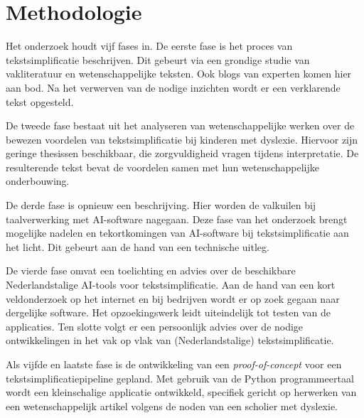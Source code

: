 



\section{Methodologie}%
\label{sec:methodologie}

Het onderzoek houdt vijf fases in. De eerste fase is het proces van tekstsimplificatie beschrijven. Dit gebeurt via een grondige studie van vakliteratuur en wetenschappelijke teksten. Ook blogs van experten komen hier aan bod. Na het verwerven van de nodige inzichten wordt er een verklarende tekst opgesteld.

De tweede fase bestaat uit het analyseren van wetenschappelijke werken over de bewezen voordelen van tekstsimplificatie bij kinderen met dyslexie. Hiervoor zijn geringe thesissen beschikbaar, die zorgvuldigheid vragen tijdens interpretatie. De resulterende tekst bevat de voordelen samen met hun wetenschappelijke onderbouwing.

De derde fase is opnieuw een beschrijving. Hier worden de valkuilen bij taalverwerking met AI-software nagegaan. Deze fase van het onderzoek brengt mogelijke nadelen en tekortkomingen van AI-software bij tekstsimplificatie aan het licht. Dit gebeurt aan de hand van een technische uitleg.

De vierde fase omvat een toelichting en advies over de beschikbare Nederlandstalige AI-tools voor tekstsimplificatie. Aan de hand van een kort veldonderzoek op het internet en bij bedrijven wordt er op zoek gegaan naar dergelijke software. Het opzoekingswerk leidt uiteindelijk tot testen van de applicaties. Ten slotte volgt er een persoonlijk advies over de nodige ontwikkelingen in het vak op vlak van (Nederlandstalige) tekstsimplificatie.

Als vijfde en laatste fase is de ontwikkeling van een \textit{proof-of-concept} voor een tekstsimplificatiepipeline gepland. Met gebruik van de Python programmeertaal wordt een kleinschalige applicatie ontwikkeld, specifiek gericht op herwerken van een wetenschappelijk artikel volgens de noden van een scholier met dyslexie.

